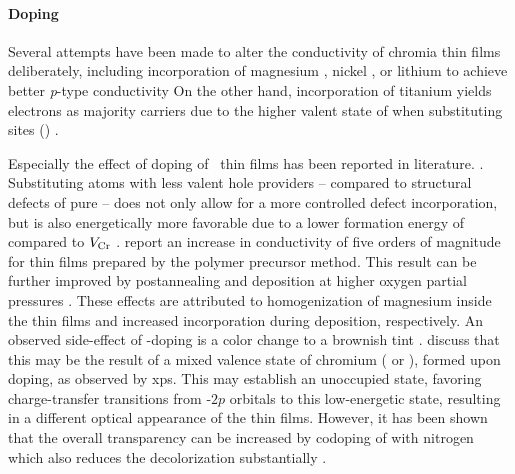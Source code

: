 \paragraph{Doping}
Several attempts have been made to alter the conductivity of chromia thin films deliberately, including incorporation of magnesium
    \cite{uekawa1996,arca2011,farrell2015},
nickel
    \cite{arca2017},
or lithium
    \cite{hagel1965,crosbie1984}
to achieve better \textit{p}-type conductivity
On the other hand, incorporation of titanium yields electrons as majority carriers 
    \cite{holt1994}
due to the higher valent state of  when substituting  sites ()
    \cite{kofstad1980}.

Especially the effect of  doping of \cro\ thin films has been reported in literature. 
    \cite{holt1994,uekawa1996,arca2011,arca2013,farrell2015,arca2017,kehoe2016}.
Substituting  atoms with less valent hole providers -- compared to structural defects of pure  -- does not only allow for a more controlled defect incorporation, but is also energetically more favorable due to a lower formation energy of  compared to $V_{\ce{Cr}}$
    \cite{kehoe2016}.
\textcite{uekawa1996} report an increase in conductivity of five orders of magnitude for  thin films prepared by the polymer precursor method.
This result can be further improved by postannealing
    \cite{farrell2015}
and deposition at higher oxygen partial pressures
    \cite{holt1994,farrell2015}.
These effects are attributed to homogenization of magnesium inside the thin films and increased  incorporation during deposition, respectively.
An observed side-effect of -doping is a color change to a brownish tint
    \cite{uekawa1996,arca2013}.
\textcite{uekawa1996} discuss that this may be the result of a mixed valence state of chromium ( or ), formed upon doping, as observed by \gls{xps}.
This may establish an unoccupied state, favoring charge-transfer transitions from -$2p$ orbitals to this low-energetic state, resulting in a different optical appearance of the thin films.
However, it has been shown that the overall transparency can be increased by codoping of  with nitrogen which also reduces the decolorization substantially
    \cite{arca2011,arca2013}.